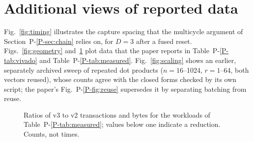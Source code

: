 \section{Additional views of reported data}

Fig.~\ref{fig:timing} illustrates the capture spacing that the multicycle
argument of Section~P-\ref{P-sec:chain} relies on, for $D=3$ after a fused
reset. Figs.~\ref{fig:geometry} and~\ref{fig:sup-cost} plot data that the
paper reports in Table~P-\ref{P-tab:vivado} and Table~P-\ref{P-tab:measured}.
Fig.~\ref{fig:scaling} shows an earlier, separately archived sweep of
repeated dot products ($n=16$--1024, $r=1$--64, both vectors reused), whose
counts agree with the closed forms checked by its own script; the paper's
Fig.~P-\ref{P-fig:reuse} supersedes it by separating batching from reuse.





\begin{figure}[t]
  \centering
  
  \caption{Ratios of v3 to v2 transactions and bytes for the workloads of
  Table~P-\ref{P-tab:measured}; values below one indicate a reduction. Counts,
  not times.}
  \label{fig:sup-cost}
\end{figure}


